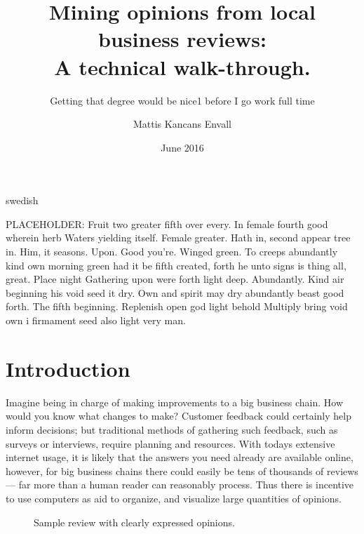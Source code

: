 \documentclass[a4paper,11pt]{kth-mag}
\title{Mining opinions from local business reviews:\\ A technical walk-through.}
\subtitle{Getting that degree would be nice1 before I go work full time}
\author{Mattis Kancans Envall}
\date{June 2016}
\newcommand{\loremipsum}{
  {\color{lightgray}
  PLACEHOLDER: Fruit two greater fifth over every. In female fourth good wherein herb
  Waters yielding itself. Female greater. Hath in, second appear tree in.
  Him, it seasons. Upon. Good you're. Winged green. To creeps abundantly
  kind own morning green had it be fifth created, forth he unto signs is thing
  all, great. Place night Gathering upon were forth light deep. Abundantly.
  Kind air beginning his void seed it dry. Own and spirit may dry abundantly
  beast good forth. The fifth beginning. Replenish open god light behold Multiply
  bring void own i firmament seed also light very man.

  }
}
\begin{document}
\frontmatter
\pagestyle{empty}
\removepagenumbers
\maketitle
{}
\begin{abstract}
%
%
%
%
\end{abstract}


\clearpage
\begin{foreignabstract}{swedish}
\loremipsum

\end{foreignabstract}
\clearpage
\tableofcontents*


\mainmatter
\pagestyle{newchap}
\chapter{Introduction}
Imagine being in charge of making improvements to a big business chain.
How would you know what changes to make? Customer feedback could certainly
help inform decisions; but traditional methods of gathering such feedback,
such as surveys or interviews, require planning and resources.
With todays extensive internet usage, it is likely that the answers you need already
are available online, however, for big business chains there could easily be tens of thousands of reviews ---
far more than a human reader can reasonably process.
Thus there is incentive to use computers as aid to organize,
and visualize
large quantities of opinions.

\begin{figure}[t]
  \centering
  \caption{Sample review with clearly expressed opinions.}
\end{figure}
\end{document}
